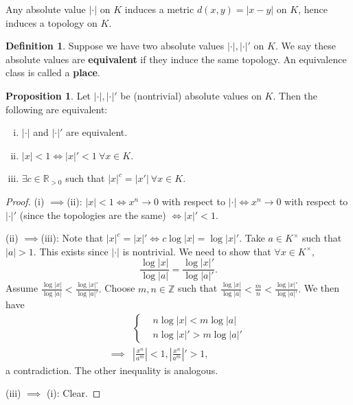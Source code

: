 \documentclass{article}
\theoremstyle{definition}
\newtheorem{prop}[theorem]{Proposition}
\newtheorem{defn}{Definition}[section]
\begin{document}
Any absolute value $|\cdot |$ on $K$ induces a metric $d(x,y) = |x-y|$ on $K$, hence induces a topology on $K$.

\begin{defn}
    Suppose we have two absolute values $|\cdot |, |\cdot |'$ on $K$. We say these absolute values are \textbf{equivalent} if they induce the same topology. An equivalence class is called a \textbf{place}.
\end{defn}
\begin{prop}
    Let $|\cdot|, |\cdot|'$ be (nontrivial) absolute values on $K$. Then the following are equivalent:
    \begin{enumerate}[(i)]
        \item $|\cdot|$ and $|\cdot|'$ are equivalent.
        \item $|x| < 1 \iff |x|' < 1 ~\forall x \in K$.
        \item $\exists c \in \mathbb{R}_{>0}$ such that $|x|^c = |x'| ~\forall x \in K$.
    \end{enumerate}
\end{prop}
\begin{proof}
    (i) $\implies $(ii): $|x|<1 \iff x^n \to 0$ with respect to $|\cdot| \iff x^n \to 0$ with respect to $|\cdot|'$ (since the topologies are the same) $\iff |x|'<1$. 
    \vspace{1mm}
     
    (ii) $\implies $(iii): Note that $|x|^c = |x|' \iff c \log |x| = \log |x|'$. Take $a \in K^\times$ such that $|a| > 1$. This exists since $|\cdot|$ is nontrivial. We need to show that $\forall x \in K^\times,$\[
     \frac{\log |x|}{\log |a|} = \frac{\log|x|'}{\log|a|'}.
    \]
    Assume $\frac{\log |x|}{\log |a|} < \frac{\log|x|'}{\log|a|'}.$ Choose $m, n \in \mathbb{Z}$ such that $\frac{\log |x|}{\log |a|} < \frac{m}{n} < \frac{\log|x|'}{\log|a|'}.$ We then have 
    \begin{align*}
        &\begin{cases}
            &n \log |x| < m \log |a|\\
            &n \log |x|' > m \log|a|'
        \end{cases}\\
        \implies & \left|\frac{x^n}{a^m}\right|<1, \left|\frac{x^n}{a^m}\right|' > 1,
    \end{align*}
    a contradiction. The other inequality is analogous.
    \vspace{1mm}
     
    (iii) $\implies$ (i): Clear.
\end{proof}
\end{document}
